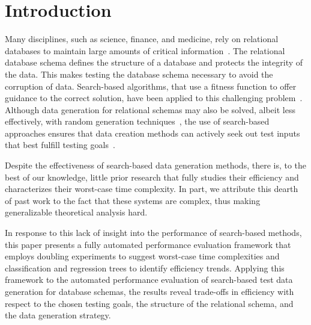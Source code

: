 
\vspace*{-.25in}
\section{Introduction}
\vspace*{-.05in}



Many disciplines, such as science, finance, and medicine, rely on relational databases to maintain large amounts of
critical information~\cite{kapfhammer2007}. The relational database schema defines the structure of a database and
protects the integrity of the data. This makes testing the database schema necessary to avoid the corruption of data.
Search-based algorithms, that use a fitness function to offer guidance to the correct solution, have been applied to
this challenging problem~\cite{kapfhammer2013}. Although data generation for relational schemas may also be solved,
albeit less effectively, with random generation techniques~\cite{mcminn2015}, the use of search-based approaches ensures
that data creation methods can actively seek out test inputs that best fulfill testing goals~\cite{mcminn2004a}.



Despite the effectiveness of search-based data generation methods, there is, to the best of our knowledge, little prior
research that fully studies their efficiency and characterizes their worst-case time complexity. In part, we attribute
this dearth of past work to the fact that these systems are complex, thus making generalizable theoretical analysis
hard.

In response to this lack of insight into the performance of search-based methods, this paper presents a fully automated
performance evaluation framework that employs doubling experiments to suggest worst-case time complexities and
classification and regression trees to identify efficiency trends. Applying this framework to the automated performance
evaluation of search-based test data generation for database schemas, the results reveal trade-offs in efficiency with
respect to the chosen testing goals, the structure of the relational schema, and the data generation strategy.

